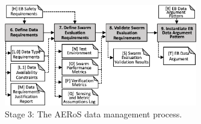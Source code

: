 \documentclass[runningheads]{llncs}
\begin{document}

\begin{figure}[!t]%
	\centering
	\vspace{-1ex} %
	\includegraphics[width=0.75\textwidth]{figures/AERoS-Stage3-V2.pdf}%
	\vspace{-2ex} %
	\caption{Stage 3: The AERoS data management process.}
	\label{amlas-a-stage3}
	\vspace{-4ex} %
\end{figure}
\end{document}
